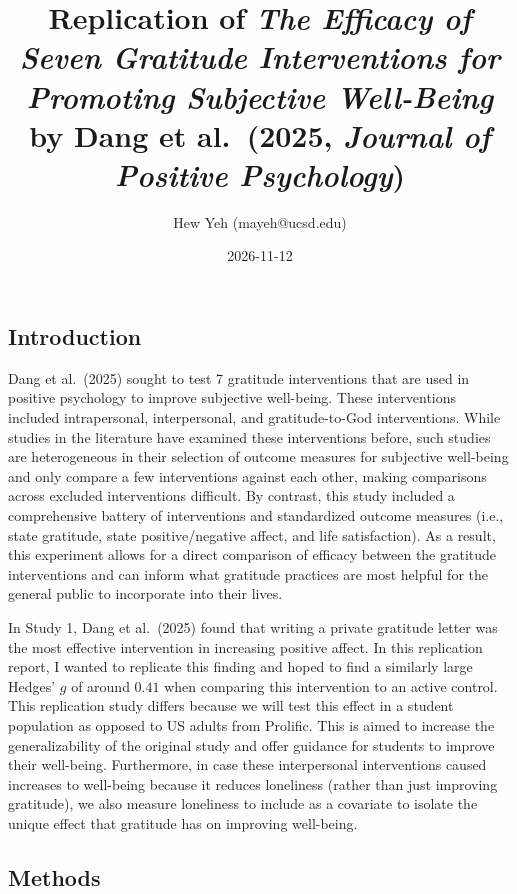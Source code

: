 \documentclass[
  letterpaper,
  DIV=11,
  numbers=noendperiod]{scrartcl}
\title{Replication of \emph{The Efficacy of Seven Gratitude
Interventions for Promoting Subjective Well-Being} by Dang et al.~(2025,
\emph{Journal of Positive Psychology})}
\author{Hew Yeh (mayeh@ucsd.edu)}
\date{2026-11-12}
\renewcommand*\contentsname{Table of contents}
\newcommand\contentsname{Table of contents}
\begin{document}
\maketitle

\renewcommand*\contentsname{Table of contents}
{
\setcounter{tocdepth}{3}
\tableofcontents
}

\subsection{Introduction}\label{introduction}

Dang et al.~(2025) sought to test 7 gratitude interventions that are
used in positive psychology to improve subjective well-being. These
interventions included intrapersonal, interpersonal, and
gratitude-to-God interventions. While studies in the literature have
examined these interventions before, such studies are heterogeneous in
their selection of outcome measures for subjective well-being and only
compare a few interventions against each other, making comparisons
across excluded interventions difficult. By contrast, this study
included a comprehensive battery of interventions and standardized
outcome measures (i.e., state gratitude, state positive/negative affect,
and life satisfaction). As a result, this experiment allows for a direct
comparison of efficacy between the gratitude interventions and can
inform what gratitude practices are most helpful for the general public
to incorporate into their lives.

In Study 1, Dang et al.~(2025) found that writing a private gratitude
letter was the most effective intervention in increasing positive
affect. In this replication report, I wanted to replicate this finding
and hoped to find a similarly large Hedges' \(g\) of around \(0.41\)
when comparing this intervention to an active control. This replication
study differs because we will test this effect in a student population
as opposed to US adults from Prolific. This is aimed to increase the
generalizability of the original study and offer guidance for students
to improve their well-being. Furthermore, in case these interpersonal
interventions caused increases to well-being because it reduces
loneliness (rather than just improving gratitude), we also measure
loneliness to include as a covariate to isolate the unique effect that
gratitude has on improving well-being.

\subsection{Methods}\label{methods}
\end{document}
